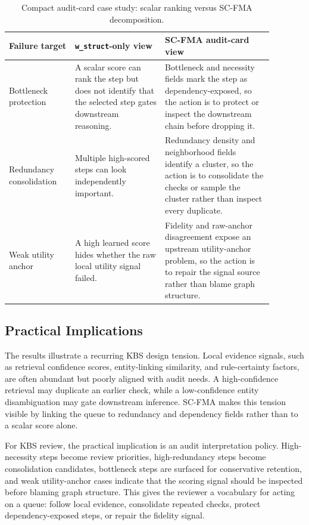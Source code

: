 \documentclass[a4paper,fleqn]{cas-sc}
\begin{document}
\begin{table}[H]
\caption{Compact audit-card case study: scalar ranking versus SC-FMA decomposition.}
\label{tab:compact-audit-card-case}
\centering
\small
\renewcommand{\arraystretch}{1.08}
\begin{tabular}{Z{0.22\linewidth}Z{0.30\linewidth}Z{0.36\linewidth}}
\toprule
\textbf{Failure target} & \textbf{\texttt{w\_struct}-only view} & \textbf{SC-FMA audit-card view} \\
\midrule
Bottleneck protection & A scalar score can rank the step but does not identify that the selected step gates downstream reasoning. & Bottleneck and necessity fields mark the step as dependency-exposed, so the action is to protect or inspect the downstream chain before dropping it. \\
Redundancy consolidation & Multiple high-scored steps can look independently important. & Redundancy density and neighborhood fields identify a cluster, so the action is to consolidate the checks or sample the cluster rather than inspect every duplicate. \\
Weak utility anchor & A high learned score hides whether the raw local utility signal failed. & Fidelity and raw-anchor disagreement expose an upstream utility-anchor problem, so the action is to repair the signal source rather than blame graph structure. \\
\bottomrule
\end{tabular}
\end{table}

\subsection{Practical Implications}
\label{sec:audit-kbs-analogy}

The results illustrate a recurring KBS design tension. Local evidence signals, such as retrieval confidence scores, entity-linking similarity, and rule-certainty factors, are often abundant but poorly aligned with audit needs. A high-confidence retrieval may duplicate an earlier check, while a low-confidence entity disambiguation may gate downstream inference. SC-FMA makes this tension visible by linking the queue to redundancy and dependency fields rather than to a scalar score alone.

For KBS review, the practical implication is an audit interpretation policy. High-necessity steps become review priorities, high-redundancy steps become consolidation candidates, bottleneck steps are surfaced for conservative retention, and weak utility-anchor cases indicate that the scoring signal should be inspected before blaming graph structure. This gives the reviewer a vocabulary for acting on a queue: follow local evidence, consolidate repeated checks, protect dependency-exposed steps, or repair the fidelity signal.
\end{document}
